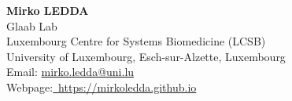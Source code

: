 \documentclass{CV}
\newcommand{\mail}[1]{\href{mailto:#1}{#1}}
\begin{document}
\begin{center}
	{\textbf{\LARGE Mirko LEDDA}}\\
	Glaab Lab\\
	Luxembourg Centre for Systems Biomedicine (LCSB)\\
	University of Luxembourg, Esch-sur-Alzette, Luxembourg\\
	Email: \mail{mirko.ledda@uni.lu}\\
	Webpage:\href{https://mirkoledda.github.io}{~https://mirkoledda.github.io}\\
\end{center}
~







\vspace{-1.5em}
\end{document}
